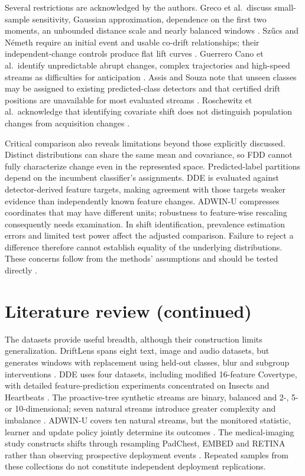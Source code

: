 \documentclass[10pt,a4paper]{article}
\begin{document}
Several restrictions are acknowledged by the authors. Greco et al.\ discuss small-sample sensitivity, Gaussian approximation, dependence on the first two moments, an unbounded distance scale and nearly balanced windows \cite[Sec.~VI]{greco}. Sz\H{u}cs and N\'emeth require an initial event and usable co-drift relationships; their independent-change controls produce flat lift curves \cite[Secs.~4.3,5.2,6]{szucs}. Guerrero Cano et al.\ identify unpredictable abrupt changes, complex trajectories and high-speed streams as difficulties for anticipation \cite[Sec.~7]{guerrero}. Assis and Souza note that unseen classes may be assigned to existing predicted-class detectors and that certified drift positions are unavailable for most evaluated streams \cite[Sec.~6.3]{assis}. Roschewitz et al.\ acknowledge that identifying covariate shift does not distinguish population changes from acquisition changes \cite[Sec.~5]{roschewitz}.

Critical comparison also reveals limitations beyond those explicitly discussed. Distinct distributions can share the same mean and covariance, so FDD cannot fully characterize change even in the represented space. Predicted-label partitions depend on the incumbent classifier's assignments. DDE is evaluated against detector-derived feature targets, making agreement with those targets weaker evidence than independently known feature changes. ADWIN-U compresses coordinates that may have different units; robustness to feature-wise rescaling consequently needs examination. In shift identification, prevalence estimation errors and limited test power affect the adjusted comparison. Failure to reject a difference therefore cannot establish equality of the underlying distributions. These concerns follow from the methods' assumptions and should be tested directly \cite{greco,szucs,assis,roschewitz}.

\newpage
\section*{Literature review (continued)}
The datasets provide useful breadth, although their construction limits generalization. DriftLens spans eight text, image and audio datasets, but generates windows with replacement using held-out classes, blur and subgroup interventions \cite[Sec.~V-A]{greco}. DDE uses four datasets, including modified 16-feature Covertype, with detailed feature-prediction experiments concentrated on Insects and Heartbeats \cite[Secs.~4--5]{szucs}. The proactive-tree synthetic streams are binary, balanced and 2-, 5- or 10-dimensional; seven natural streams introduce greater complexity and imbalance \cite[Secs.~5--6]{guerrero}. ADWIN-U covers ten natural streams, but the monitored statistic, learner and update policy jointly determine its outcomes \cite[Sec.~6]{assis}. The medical-imaging study constructs shifts through resampling PadChest, EMBED and RETINA rather than observing prospective deployment events \cite[Sec.~3.2]{roschewitz}. Repeated samples from these collections do not constitute independent deployment replications.
\end{document}
